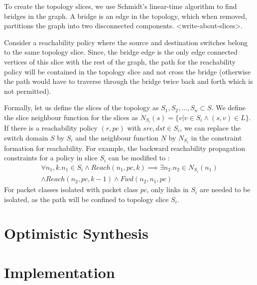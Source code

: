 \documentclass[]{sig}
\begin{document}
To create the topology slices, we use Schmidt's linear-time algorithm\cite{schmidt} to find bridges in the graph. A bridge is an edge in the topology, which when removed, partitions the graph into two disconnected components. <write-about-slices>. 

Consider a reachability policy where the source and destination switches belong to the same topology slice. Since, the bridge edge is the only edge connected vertices of this slice with the rest of the graph, the path for the reachability policy will be contained in the topology slice and not cross the bridge (otherwise the path would have to traverse through the bridge twice back and forth which is not permitted). 

Formally, let us define the slices of the topology as $S_1, S_2, ..., S_n \subset S$. We define the slice neighbour function for the slices as $N_{S_i}(s) = \{v | v \in S_i \wedge (s,v) \in L\}$. If there is a reachability policy $(r, pc)$ with $src,dst \in S_i$, we can replace the switch domain $S$ by $S_i$ and the neighbour function $N$ by $N_{S_i}$ in the constraint formation for reachability. For example, the backward reachability propagation constraints for a policy in slice $S_i$ can be modified to : 
\begin{multline}
\forall n_1,k.  n_1 \in S_i \wedge Reach(n_1,pc,k) \implies \exists n_2. n_2 \in N_{S_i}(n_1) \\ \wedge  Reach(n_2,pc,k-1) \wedge Fwd(n_2,n_1,pc)
\end{multline}
For packet classes isolated with packet class $pc$, only links in $S_i$ are needed to be isolated, as the path will be confined to topology slice $S_i$. 

\section{Optimistic Synthesis} \label{sec:optimistic}

\section{Implementation}
\end{document}
